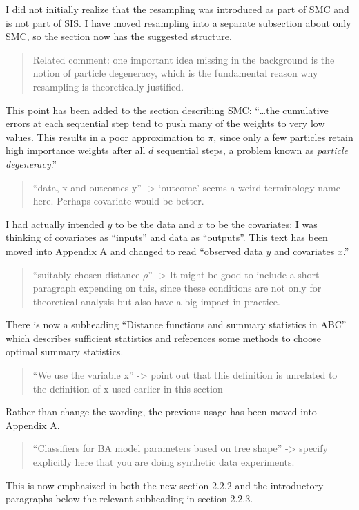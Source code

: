 \documentclass[12pt]{article}
\begin{document}
I did not initially realize that the resampling was introduced as part of SMC
and is not part of SIS. I have moved resampling into a separate subsection
about only SMC, so the section now has the suggested structure.

\begin{quote}
  \itshape

  Related comment: one important idea missing in the background is the notion
  of particle degeneracy, which is the fundamental reason why resampling is
  theoretically justified.
\end{quote}

This point has been added to the section describing SMC: ``\ldots the
cumulative errors at each sequential step tend to push many of the weights to
very low values. This results in a poor approximation to $\pi$, since only a
few particles retain high importance weights after all $d$ sequential steps, a
problem known as \emph{particle degeneracy}.''

\begin{quote}
  \itshape
  
  ``data, x and outcomes y'' -> `outcome' seems a weird terminology name here.
  Perhaps covariate would be better.
\end{quote}

I had actually intended $y$ to be the data and $x$ to be the covariates: I was
thinking of covariates as ``inputs'' and data as ``outputs''. This text has
been moved into Appendix A and changed to read ``observed data $y$ and
covariates $x$.''

\begin{quote}
  \itshape

  ``suitably chosen distance $\rho$'' -> It might be good to include a short
  paragraph expending on this, since these conditions are not only for
  theoretical analysis but also have a big impact in practice. 
\end{quote}

There is now a subheading ``Distance functions and summary statistics in ABC''
which describes sufficient statistics and references some methods to choose
optimal summary statistics.

\begin{quote}
  \itshape

  ``We use the variable x'' -> point out that this definition is unrelated to
  the definition of x used earlier in this section
\end{quote}

Rather than change the wording, the previous usage has been moved into Appendix
A.

\begin{quote}
  \itshape

  ``Classifiers for BA model parameters based on tree shape'' -> specify
  explicitly here that you are doing synthetic data experiments. 
\end{quote}

This is now emphasized in both the new section 2.2.2 and the introductory
paragraphs below the relevant subheading in section 2.2.3.
\end{document}
